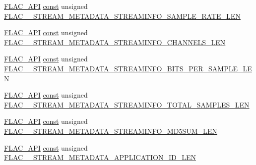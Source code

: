 \begin{DoxyCompactItemize}
\item 
\hyperlink{group__flac__export_ga56ca07df8a23310707732b1c0007d6f5}{F\+L\+A\+C\+\_\+\+A\+PI} \hyperlink{getopt1_8c_a2c212835823e3c54a8ab6d95c652660e}{const} unsigned \hyperlink{group__flac__format_gad0d8c637c666ef08cad2d9668f3e9ecf}{F\+L\+A\+C\+\_\+\+\_\+\+S\+T\+R\+E\+A\+M\+\_\+\+M\+E\+T\+A\+D\+A\+T\+A\+\_\+\+S\+T\+R\+E\+A\+M\+I\+N\+F\+O\+\_\+\+S\+A\+M\+P\+L\+E\+\_\+\+R\+A\+T\+E\+\_\+\+L\+EN}
\item 
\hyperlink{group__flac__export_ga56ca07df8a23310707732b1c0007d6f5}{F\+L\+A\+C\+\_\+\+A\+PI} \hyperlink{getopt1_8c_a2c212835823e3c54a8ab6d95c652660e}{const} unsigned \hyperlink{group__flac__format_gadc990fec49da063c33debfc2817c0e98}{F\+L\+A\+C\+\_\+\+\_\+\+S\+T\+R\+E\+A\+M\+\_\+\+M\+E\+T\+A\+D\+A\+T\+A\+\_\+\+S\+T\+R\+E\+A\+M\+I\+N\+F\+O\+\_\+\+C\+H\+A\+N\+N\+E\+L\+S\+\_\+\+L\+EN}
\item 
\hyperlink{group__flac__export_ga56ca07df8a23310707732b1c0007d6f5}{F\+L\+A\+C\+\_\+\+A\+PI} \hyperlink{getopt1_8c_a2c212835823e3c54a8ab6d95c652660e}{const} unsigned \hyperlink{group__flac__format_ga84c55a68f58fff56e23fda6d24bd3510}{F\+L\+A\+C\+\_\+\+\_\+\+S\+T\+R\+E\+A\+M\+\_\+\+M\+E\+T\+A\+D\+A\+T\+A\+\_\+\+S\+T\+R\+E\+A\+M\+I\+N\+F\+O\+\_\+\+B\+I\+T\+S\+\_\+\+P\+E\+R\+\_\+\+S\+A\+M\+P\+L\+E\+\_\+\+L\+EN}
\item 
\hyperlink{group__flac__export_ga56ca07df8a23310707732b1c0007d6f5}{F\+L\+A\+C\+\_\+\+A\+PI} \hyperlink{getopt1_8c_a2c212835823e3c54a8ab6d95c652660e}{const} unsigned \hyperlink{group__flac__format_ga061dcc54018329ac1b893d95b3970ebc}{F\+L\+A\+C\+\_\+\+\_\+\+S\+T\+R\+E\+A\+M\+\_\+\+M\+E\+T\+A\+D\+A\+T\+A\+\_\+\+S\+T\+R\+E\+A\+M\+I\+N\+F\+O\+\_\+\+T\+O\+T\+A\+L\+\_\+\+S\+A\+M\+P\+L\+E\+S\+\_\+\+L\+EN}
\item 
\hyperlink{group__flac__export_ga56ca07df8a23310707732b1c0007d6f5}{F\+L\+A\+C\+\_\+\+A\+PI} \hyperlink{getopt1_8c_a2c212835823e3c54a8ab6d95c652660e}{const} unsigned \hyperlink{group__flac__format_ga35030375a8c77a3799bceea07f95b221}{F\+L\+A\+C\+\_\+\+\_\+\+S\+T\+R\+E\+A\+M\+\_\+\+M\+E\+T\+A\+D\+A\+T\+A\+\_\+\+S\+T\+R\+E\+A\+M\+I\+N\+F\+O\+\_\+\+M\+D5\+S\+U\+M\+\_\+\+L\+EN}
\item 
\hyperlink{group__flac__export_ga56ca07df8a23310707732b1c0007d6f5}{F\+L\+A\+C\+\_\+\+A\+PI} \hyperlink{getopt1_8c_a2c212835823e3c54a8ab6d95c652660e}{const} unsigned \hyperlink{group__flac__format_ga8a1d1839a9e22692dfeaf9fce9cb9991}{F\+L\+A\+C\+\_\+\+\_\+\+S\+T\+R\+E\+A\+M\+\_\+\+M\+E\+T\+A\+D\+A\+T\+A\+\_\+\+A\+P\+P\+L\+I\+C\+A\+T\+I\+O\+N\+\_\+\+I\+D\+\_\+\+L\+EN}

\end{DoxyCompactItemize}

